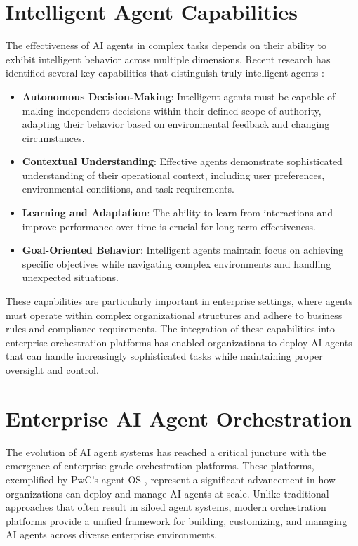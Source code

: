 \documentclass[conference]{IEEEtran}
\begin{document}
\section{Intelligent Agent Capabilities}
The effectiveness of AI agents in complex tasks depends on their ability to exhibit intelligent behavior across multiple dimensions. Recent research has identified several key capabilities that distinguish truly intelligent agents \cite{gartner2025intelligent}:

\begin{itemize}
\item \textbf{Autonomous Decision-Making}: Intelligent agents must be capable of making independent decisions within their defined scope of authority, adapting their behavior based on environmental feedback and changing circumstances.
\item \textbf{Contextual Understanding}: Effective agents demonstrate sophisticated understanding of their operational context, including user preferences, environmental conditions, and task requirements.
\item \textbf{Learning and Adaptation}: The ability to learn from interactions and improve performance over time is crucial for long-term effectiveness.
\item \textbf{Goal-Oriented Behavior}: Intelligent agents maintain focus on achieving specific objectives while navigating complex environments and handling unexpected situations.
\end{itemize}

These capabilities are particularly important in enterprise settings, where agents must operate within complex organizational structures and adhere to business rules and compliance requirements. The integration of these capabilities into enterprise orchestration platforms has enabled organizations to deploy AI agents that can handle increasingly sophisticated tasks while maintaining proper oversight and control.

\section{Enterprise AI Agent Orchestration}
The evolution of AI agent systems has reached a critical juncture with the emergence of enterprise-grade orchestration platforms. These platforms, exemplified by PwC's agent OS \cite{pwc2025agentos}, represent a significant advancement in how organizations can deploy and manage AI agents at scale. Unlike traditional approaches that often result in siloed agent systems, modern orchestration platforms provide a unified framework for building, customizing, and managing AI agents across diverse enterprise environments.
\end{document}
